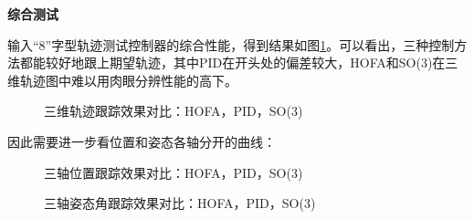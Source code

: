 \textbf{综合测试}


  输入“8”字型轨迹测试控制器的综合性能，得到结果如图\ref{matlab_3d}。可以看出，三种控制方法都能较好地跟上期望轨迹，其中PID在开头处的偏差较大，HOFA和SO(3)在三维轨迹图中难以用肉眼分辨性能的高下。

  
  \begin{figure}[h]
      \centering
      \begin{minipage}[t]{0.33\textwidth}
        \centering
      \end{minipage}\hfill
      \begin{minipage}[t]{0.33\textwidth}
        \centering
      \end{minipage}\hfill
      \begin{minipage}[t]{0.33\textwidth}
        \centering
      \end{minipage}
      \caption{三维轨迹跟踪效果对比：HOFA，PID，SO(3)}
      \label{matlab_3d}
  \end{figure}
 
  因此需要进一步看位置和姿态各轴分开的曲线：

  \begin{figure}[h]
    \centering
    \begin{minipage}[t]{0.33\textwidth}
      \centering
    \end{minipage}\hfill
    \begin{minipage}[t]{0.33\textwidth}
      \centering
    \end{minipage}\hfill
    \begin{minipage}[t]{0.33\textwidth}
      \centering
    \end{minipage}
    \caption{三轴位置跟踪效果对比：HOFA，PID，SO(3)}
    \label{matlab_x}
\end{figure}

\begin{figure}[h]
  \centering
  \begin{minipage}[t]{0.33\textwidth}
    \centering
  \end{minipage}\hfill
  \begin{minipage}[t]{0.33\textwidth}
    \centering
  \end{minipage}\hfill
  \begin{minipage}[t]{0.33\textwidth}
    \centering
  \end{minipage}
  \caption{三轴姿态角跟踪效果对比：HOFA，PID，SO(3)}
  \label{matlab_angle}
\end{figure}

